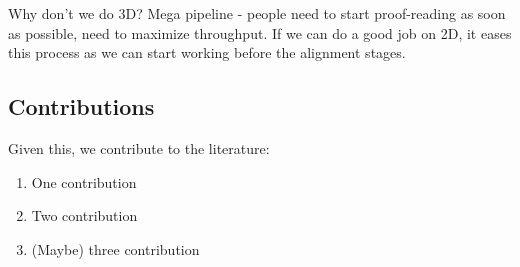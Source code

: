 Why don't we do 3D? Mega pipeline - people need to start proof-reading as soon as possible, need to maximize throughput. If we can do a good job on 2D, it eases this process as we can start working before the alignment stages.

\subsection{Contributions}

Given this, we contribute to the literature:
\begin{enumerate}
\item One contribution
\item Two contribution
\item (Maybe) three contribution
\end{enumerate}